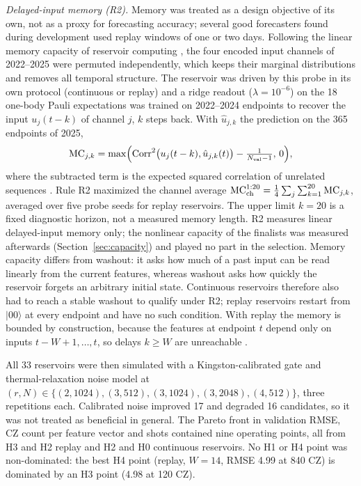 \documentclass[journal]{IEEEtran}
\begin{document}
\emph{Delayed-input memory (R2).} Memory was treated as a design objective of its own, not as a proxy for forecasting accuracy; several good forecasters found during development used replay windows of one or two days. Following the linear memory capacity of reservoir computing \cite{Jaeger2002STM,Dambre2012Capacity}, the four encoded input channels of 2022--2025 were permuted independently, which keeps their marginal distributions and removes all temporal structure. The reservoir was driven by this probe in its own protocol (continuous or replay) and a ridge readout ($\lambda=10^{-6}$) on the 18 one-body Pauli expectations was trained on 2022--2024 endpoints to recover the input $u_j(t-k)$ of channel $j$, $k$ steps back. With $\hat u_{j,k}$ the prediction on the 365 endpoints of 2025,
\begin{equation}
\mathrm{MC}_{j,k}=\max\!\Big(\mathrm{Corr}^2\big(u_j(t-k),\hat u_{j,k}(t)\big)-\tfrac{1}{N_{\rm val}-1},\,0\Big),
\label{eq:mc}
\end{equation}
where the subtracted term is the expected squared correlation of unrelated sequences \cite{Dambre2012Capacity}. Rule R2 maximized the channel average $\mathrm{MC}_{\rm ch}^{1:20}=\frac14\sum_{j}\sum_{k=1}^{20}\mathrm{MC}_{j,k}$, averaged over five probe seeds for replay reservoirs. The upper limit $k=20$ is a fixed diagnostic horizon, not a measured memory length. R2 measures linear delayed-input memory only; the nonlinear capacity of the finalists was measured afterwards (Section~\ref{sec:capacity}) and played no part in the selection. Memory capacity differs from washout: it asks how much of a past input can be read linearly from the current features, whereas washout asks how quickly the reservoir forgets an arbitrary initial state. Continuous reservoirs therefore also had to reach a stable washout to qualify under R2; replay reservoirs restart from $|00\rangle$ at every endpoint and have no such condition. With replay the memory is bounded by construction, because the features at endpoint $t$ depend only on inputs $t-W+1,\dots,t$, so delays $k\ge W$ are unreachable \cite{Mujal2023Measurements}.

All 33 reservoirs were then simulated with a Kingston-calibrated gate and thermal-relaxation noise model at $(r,N)\in\{(2,1024),(3,512),(3,1024),(3,2048),(4,512)\}$, three repetitions each. Calibrated noise improved 17 and degraded 16 candidates, so it was not treated as beneficial in general. The Pareto front in validation RMSE, CZ count per feature vector and shots contained nine operating points, all from H3 and H2 replay and H2 and H0 continuous reservoirs. No H1 or H4 point was non-dominated: the best H4 point (replay, $W=14$, RMSE 4.99 at 840 CZ) is dominated by an H3 point (4.98 at 120 CZ).
\end{document}
